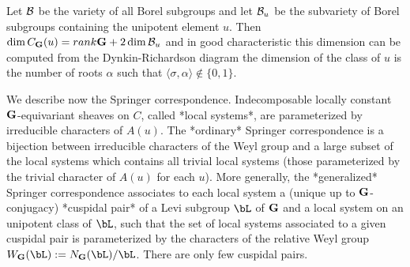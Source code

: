 Let  ${\mathcal B}$ be  the variety  of all  Borel subgroups  and let ${\mathcal B}_u$ be the
subvariety  of Borel subgroups  containing the unipotent  element $u$. Then
$\dim   C_{\bf G}(u)=rank{\bf G}+2\dim{\mathcal B}_u$  and   in  good   characteristic  this
dimension   can  be  computed  from  the  Dynkin-Richardson  diagram\:  the
dimension  of the class  of $u$ is  the number of  roots $\alpha$ such that
$\langle\sigma,\alpha\rangle\notin\{0,1\}$.

We   describe  now  the  Springer  correspondence.  Indecomposable  locally
constant  ${\bf G}$-equivariant  sheaves  on  $C$,  called *local systems*, are
parameterized  by irreducible characters of $A(u)$. The *ordinary* Springer
correspondence  is a bijection  between irreducible characters  of the Weyl
group  and a large subset  of the local systems  which contains all trivial
local  systems (those parameterized by the  trivial character of $A(u)$ for
each  $u$).  More  generally,  the  *generalized*  Springer  correspondence
associates  to each local system a (unique up to ${\bf G}$-conjugacy) *cuspidal
pair*  of a Levi subgroup $\bL$ of ${\bf G}$ and a local system on an unipotent
class  of $\bL$, such that  the set of local  systems associated to a given
cuspidal pair is parameterized by the characters of the relative Weyl group
$W_\bG(\bL):=N_\bG(\bL)/\bL$. There are only few cuspidal pairs.

